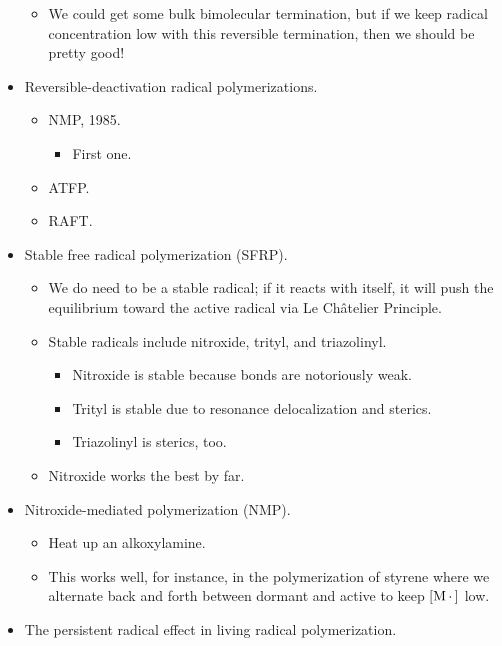 \documentclass[../notes.tex]{subfiles}
\begin{document}
\begin{itemize}
\begin{itemize}
        \item We could get some bulk bimolecular termination, but if we keep radical concentration low with this reversible termination, then we should be pretty good!
    \end{itemize}
    \item Reversible-deactivation radical polymerizations.
    \begin{itemize}
        \item NMP, 1985.
        \begin{itemize}
            \item First one.
        \end{itemize}
        \item ATFP.
        \item RAFT.
    \end{itemize}
    \item Stable free radical polymerization (SFRP).
    \begin{itemize}
        \item We do need  to be a stable radical; if it reacts with itself, it will push the equilibrium toward the active radical via Le Ch\^{a}telier Principle.
        \item Stable radicals include nitroxide, trityl, and triazolinyl.
        \begin{itemize}
            \item Nitroxide is stable because  bonds are notoriously weak.
            \item Trityl is stable due to resonance delocalization and sterics.
            \item Triazolinyl is sterics, too.
        \end{itemize}
        \item Nitroxide works the best by far.
    \end{itemize}
    \item Nitroxide-mediated polymerization (NMP).
    \begin{itemize}
        \item Heat up an alkoxylamine.
        \item This works well, for instance, in the polymerization of styrene where we alternate back and forth between dormant and active to keep $[\ce{M*}]$ low.
    \end{itemize}
    \item The persistent radical effect in living radical polymerization.
    \begin{itemize}

\end{itemize}
\end{itemize}
\end{document}
